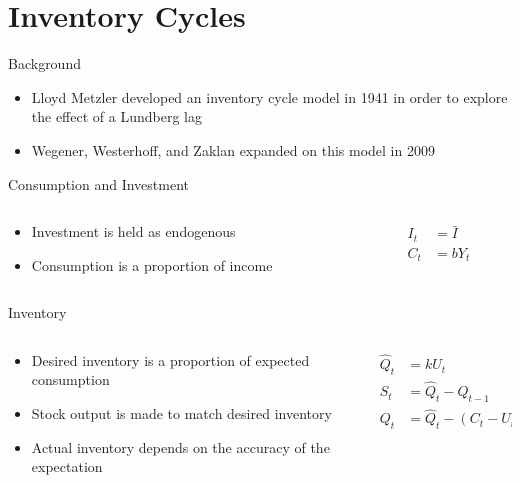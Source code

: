 \documentclass{beamer}
\begin{document}
\section*{Inventory Cycles}
\begin{frame}{Background}
	\begin{itemize}
		\item Lloyd Metzler developed an inventory cycle model in 1941 in order to explore the effect of a Lundberg lag\autocite{Metzler1941}
		\item Wegener, Westerhoff, and Zaklan expanded on this model in 2009\autocite{Wegener2009}
	\end{itemize}
\end{frame}
\begin{frame}{Consumption and Investment}
	\begin{columns}
	\begin{column}{0.5\textwidth}
		\begin{itemize}
			\item Investment is held as endogenous 
			\item Consumption is a proportion of income
		\end{itemize}
	\end{column}
	\begin{column}{0.5\textwidth}
		\begin{align*}
			I_t &= \bar I\\
			C_t &= bY_t
		\end{align*}
	\end{column}
	\end{columns}
\end{frame}

\begin{frame}{Inventory}
	\begin{columns}
	\begin{column}{0.5\textwidth}
		\begin{itemize}
			\item Desired inventory is a proportion of expected consumption
			\item Stock output is made to match desired inventory
			\item Actual inventory depends on the accuracy of the expectation
		\end{itemize}
	\end{column}
	\begin{column}{0.5\textwidth}
		\begin{align*}
			\hat Q_t &= kU_t\\
			S_t &= \hat Q_t - Q_{t-1}\\
			Q_t &= \hat Q_t - (C_t-U_t)
		\end{align*}
	\end{column}
	\end{columns}
\end{frame}
\end{document}
